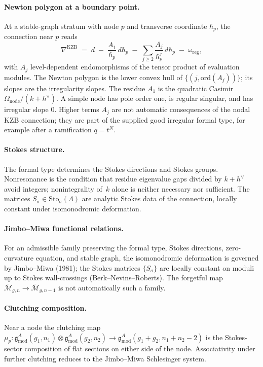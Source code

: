 \documentclass[11pt]{amsart}
\theoremstyle{definition}
\theoremstyle{remark}
\providecommand{\fg}{\mathfrak{g}}
\providecommand{\Mbar}{\overline{\mathcal{M}}}
\providecommand{\KZB}{\mathrm{KZB}}
\begin{document}
\paragraph{Newton polygon at a boundary point.}
At a stable-graph stratum with node $p$ and transverse coordinate
$\hbar_p$, the connection near $p$ reads
\[
\nabla^{\KZB}
\;=\; d
\;-\; \frac{A_1}{\hbar_p}\,d\hbar_p
\;-\; \sum_{j \geq 2} \frac{A_j}{\hbar_p^j}\,d\hbar_p
\;-\; \omega_{\mathrm{reg}},
\]
with $A_j$ level-dependent endomorphisms of the tensor product of
evaluation modules. The Newton polygon is the lower convex hull of
$\{(j, \mathrm{ord}(A_j))\}$; its slopes are the irregularity slopes.
The residue $A_1$ is the quadratic Casimir
$\Omega_{\mathrm{node}}/(k + h^\vee)$. A simple node has pole order
one, is regular singular, and has irregular slope \(0\).  Higher
terms $A_j$ are not automatic consequences of the nodal KZB
connection; they are part of the supplied good irregular formal type,
for example after a ramification \(q=t^N\).

\paragraph{Stokes structure.}
The formal type determines the Stokes directions and Stokes groups.
Nonresonance is the condition that residue eigenvalue gaps divided by
$k+h^\vee$ avoid integers; nonintegrality of~$k$ alone is neither
necessary nor sufficient. The matrices
\(S_\sigma \in \mathrm{Sto}_\sigma(\Lambda)\) are analytic Stokes
data of the connection, locally constant under isomonodromic
deformation.

\paragraph{Jimbo--Miwa functional relations.}
For an admissible family preserving the formal type, Stokes
directions, zero-curvature equation, and stable graph, the
isomonodromic deformation is governed by Jimbo--Miwa (1981); the
Stokes matrices $\{S_\sigma\}$ are locally constant on moduli up to
Stokes wall-crossings (Berk--Nevins--Roberts).  The forgetful map
$\Mbar_{g,n}\to\Mbar_{g,n-1}$ is not automatically such a family.

\paragraph{Clutching composition.}
Near a node the clutching map
$\mu_p\colon \fg^A_{\mathrm{mod}}(g_1, n_1)
\otimes \fg^A_{\mathrm{mod}}(g_2, n_2)
\to \fg^A_{\mathrm{mod}}(g_1 + g_2, n_1 + n_2 - 2)$
is the Stokes-sector composition of flat sections on either side of
the node. Associativity under further clutching reduces to the
Jimbo--Miwa Schlesinger system.
\end{document}
